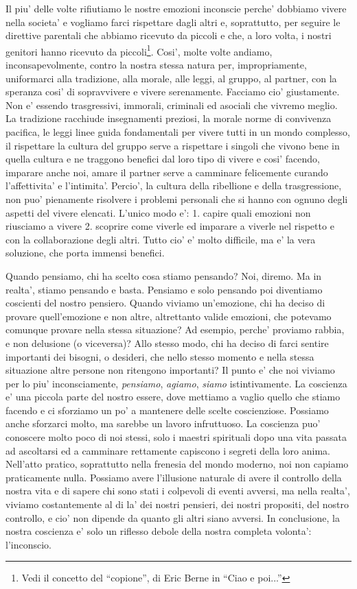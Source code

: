 Il piu' delle volte rifiutiamo le nostre emozioni inconscie perche' dobbiamo vivere nella societa' e vogliamo farci rispettare dagli altri e, soprattutto, per seguire le direttive parentali che abbiamo ricevuto da piccoli e che, a loro volta, i nostri genitori hanno ricevuto da piccoli\footnote{Vedi il concetto del ``copione'', di Eric Berne in ``Ciao e poi...''}. Cosi', molte volte andiamo, inconsapevolmente, contro la nostra stessa natura per, impropriamente, uniformarci alla tradizione, alla morale, alle leggi, al gruppo, al partner, con la speranza cosi' di sopravvivere e vivere serenamente. Facciamo cio' giustamente. Non e' essendo trasgressivi, immorali, criminali ed asociali che vivremo meglio. La tradizione racchiude insegnamenti preziosi, la morale norme di convivenza pacifica, le leggi linee guida fondamentali per vivere tutti in un mondo complesso, il rispettare la cultura del gruppo serve a rispettare i singoli che vivono bene in quella cultura e ne traggono benefici dal loro tipo di vivere e cosi' facendo, imparare anche noi, amare il partner serve a camminare felicemente curando l'affettivita' e l'intimita'. Percio', la cultura della ribellione e della trasgressione, non puo' pienamente risolvere i problemi personali che si hanno con ognuno degli aspetti del vivere elencati. L'unico modo e': 1. capire quali emozioni non riusciamo a vivere 2. scoprire come viverle ed imparare a viverle nel rispetto e con la collaborazione degli altri. Tutto cio' e' molto difficile, ma e' la vera soluzione, che porta immensi benefici.

Quando pensiamo, chi ha scelto cosa stiamo pensando? Noi, diremo. Ma in realta', stiamo pensando e basta. Pensiamo e solo pensando poi diventiamo coscienti del nostro pensiero.
Quando viviamo un'emozione, chi ha deciso di provare quell'emozione e non altre, altrettanto valide emozioni, che potevamo comunque provare nella stessa situazione? Ad esempio, perche' proviamo rabbia, e non delusione (o viceversa)?
Allo stesso modo, chi ha deciso di farci sentire importanti dei bisogni, o desideri, che nello stesso momento e nella stessa situazione altre persone non ritengono importanti? Il punto e' che noi viviamo per lo piu' inconsciamente, \emph{pensiamo}, \emph{agiamo}, \emph{siamo} istintivamente. La coscienza e' una piccola parte del nostro essere, dove mettiamo a vaglio quello che stiamo facendo e ci sforziamo un po' a mantenere delle scelte coscienziose. Possiamo anche sforzarci molto, ma sarebbe un lavoro infruttuoso. La coscienza puo' conoscere molto poco di noi stessi, solo i maestri spirituali dopo una vita passata ad ascoltarsi ed a camminare rettamente capiscono i segreti della loro anima. Nell'atto pratico, soprattutto nella frenesia del mondo moderno, noi non capiamo praticamente nulla. Possiamo avere l'illusione naturale di avere il controllo della nostra vita e di sapere chi sono stati i colpevoli di eventi avversi, ma nella realta', viviamo costantemente al di la' dei nostri pensieri, dei nostri propositi, del nostro controllo, e cio' non dipende da quanto gli altri siano avversi. In conclusione, la nostra coscienza e' solo un riflesso debole della nostra completa volonta': l'inconscio.

